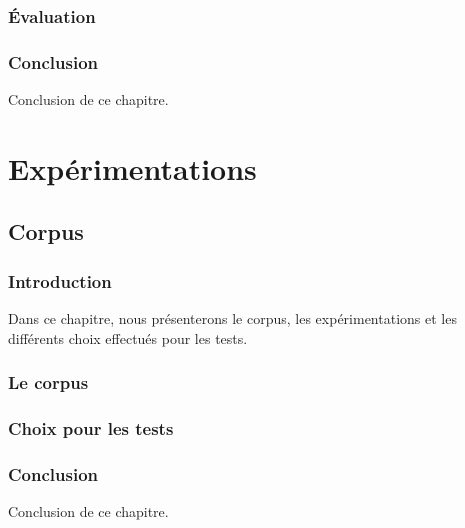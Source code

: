 \documentclass[a4paper,11pt,twoside]{memoir}
\begin{document}
\newpage



\section{Évaluation}


\section{Conclusion}
Conclusion de ce chapitre.



\part{Expérimentations}





\chapter{Corpus}
\label{chap:corpus}
\minitoc

\section{Introduction}
Dans ce chapitre, nous présenterons le corpus, les expérimentations et les différents choix effectués pour les tests.

\section{Le corpus}

\section{Choix pour les tests}

\newpage

\section{Conclusion}
Conclusion de ce chapitre.


\end{document}
